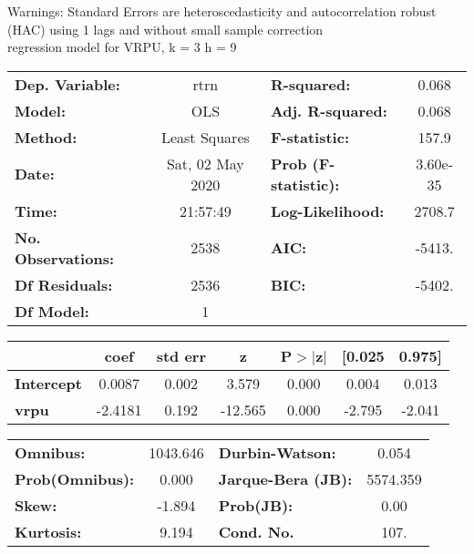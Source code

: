 Warnings: \newline
 [1] Standard Errors are heteroscedasticity and autocorrelation robust (HAC) using 1 lags and without small sample correction\\ 

regression model for VRPU, k = 3 h = 9\begin{center}
\begin{tabular}{lclc}
\toprule
\textbf{Dep. Variable:}    &       rtrn       & \textbf{  R-squared:         } &     0.068   \\
\textbf{Model:}            &       OLS        & \textbf{  Adj. R-squared:    } &     0.068   \\
\textbf{Method:}           &  Least Squares   & \textbf{  F-statistic:       } &     157.9   \\
\textbf{Date:}             & Sat, 02 May 2020 & \textbf{  Prob (F-statistic):} &  3.60e-35   \\
\textbf{Time:}             &     21:57:49     & \textbf{  Log-Likelihood:    } &    2708.7   \\
\textbf{No. Observations:} &        2538      & \textbf{  AIC:               } &    -5413.   \\
\textbf{Df Residuals:}     &        2536      & \textbf{  BIC:               } &    -5402.   \\
\textbf{Df Model:}         &           1      & \textbf{                     } &             \\
\bottomrule
\end{tabular}
\begin{tabular}{lcccccc}
                   & \textbf{coef} & \textbf{std err} & \textbf{z} & \textbf{P$> |$z$|$} & \textbf{[0.025} & \textbf{0.975]}  \\
\midrule
\textbf{Intercept} &       0.0087  &        0.002     &     3.579  &         0.000        &        0.004    &        0.013     \\
\textbf{vrpu}      &      -2.4181  &        0.192     &   -12.565  &         0.000        &       -2.795    &       -2.041     \\
\bottomrule
\end{tabular}
\begin{tabular}{lclc}
\textbf{Omnibus:}       & 1043.646 & \textbf{  Durbin-Watson:     } &    0.054  \\
\textbf{Prob(Omnibus):} &   0.000  & \textbf{  Jarque-Bera (JB):  } & 5574.359  \\
\textbf{Skew:}          &  -1.894  & \textbf{  Prob(JB):          } &     0.00  \\
\textbf{Kurtosis:}      &   9.194  & \textbf{  Cond. No.          } &     107.  \\
\bottomrule
\end{tabular}
\end{center}

